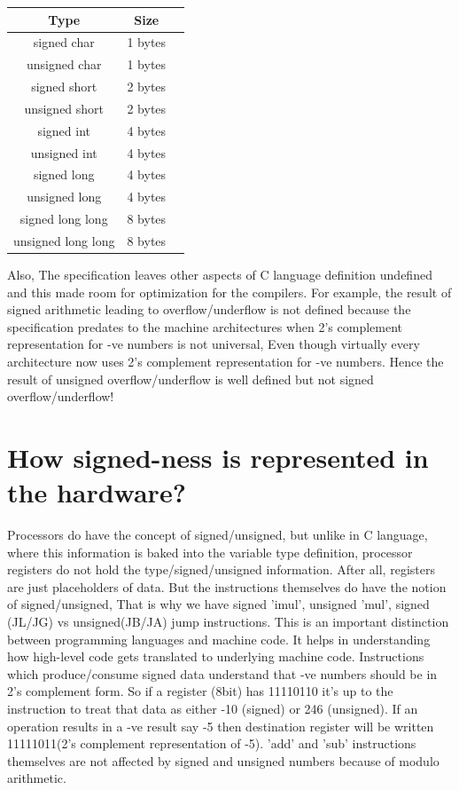 \documentclass{article}
\begin{document}
\begin{center}
\begin{tabular}{|c|c|c|}
 Type       &Size       \\
 \hline
 signed char         & 1 bytes \\
 unsigned char       & 1 bytes \\
 signed short        & 2 bytes \\
 unsigned short      & 2 bytes \\
 signed int          & 4 bytes \\
 unsigned int        & 4 bytes \\
 signed long         & 4 bytes \\
 unsigned long       & 4 bytes \\
 signed long long    & 8 bytes \\
 unsigned long long  & 8 bytes
\end{tabular}
\end{center}

Also, The specification leaves other aspects of C language definition undefined
and this made room for optimization for the compilers. For example, the result
of signed arithmetic leading to overflow/underflow is not defined because the
specification predates to the machine architectures when 2's complement
representation for -ve numbers is not universal, Even though virtually every
architecture now uses 2's complement representation for -ve numbers. Hence the
result of unsigned overflow/underflow is well defined but not signed
overflow/underflow!

\section{How signed-ness is represented in the hardware?}
Processors do have the concept of signed/unsigned, but unlike in C language,
where this information is baked into the variable type definition, processor
registers do not hold the type/signed/unsigned information. After all, registers
are just placeholders of data. But the instructions themselves do have the
notion of signed/unsigned, That is why we have signed 'imul', unsigned 'mul',
signed (JL/JG) vs unsigned(JB/JA) jump instructions. This is an important
distinction between programming languages and machine code. It helps in
understanding how high-level code gets translated to underlying machine code.
Instructions which produce/consume signed data understand that -ve numbers
should be in 2's complement form. So if a register (8bit) has 11110110 it's up
to the instruction to treat that data as either -10 (signed) or 246 (unsigned).
If an operation results in a -ve result say -5 then destination register will be
written 11111011(2's complement representation of -5). 'add' and 'sub'
instructions themselves are not affected by signed and unsigned numbers because
of modulo arithmetic.
\end{document}
